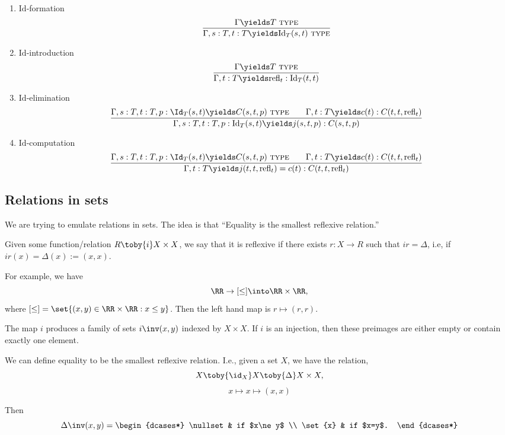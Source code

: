 \documentclass{article}
\newcommand\TYPE{\text{ \scshape{type}}}
\newcommand\IdT{\mathrm{Id}}
\newcommand\refl{\mathrm{refl}}
\begin{document}
\begin{enumerate}
    \item $\IdT$-formation
        \[ \frac{\Gamma \yields T\TYPE}{\Gamma,s:T,t:T
        \yields \IdT_T(s,t)\TYPE }
        \]
    \item $\IdT$-introduction
        \[ \frac{\Gamma \yields T\TYPE}{
            \Gamma,t:T\yields \refl_t:\IdT_T(t,t)
        }
        \]
    \item $\IdT$-elimination
        \[ \frac{
            \Gamma,s:T,t:T,p:\Id_T(s,t)
            \yields C(s,t,p)\TYPE 
            \qquad
            \Gamma,t:T\yields c(t) : C(t,t,\refl_t)
        }{
            \Gamma,s:T,t:T,p:\IdT_T(s,t) \yields 
            j(s,t,p) : C(s,t,p)
        }\]
    \item $\IdT$-computation
        \[ \frac{
            \Gamma,s:T,t:T,p:\Id_T(s,t)
            \yields C(s,t,p)\TYPE 
            \qquad
            \Gamma,t:T\yields c(t) : C(t,t,\refl_t)
        }{
            \Gamma,t:T\yields 
            j(t,t,\refl_t)=c(t) : C(t,t,\refl_t)
        }\]
\end{enumerate}

\subsection{Relations in sets}
We are trying to emulate 
relations in sets. The idea is that 
``Equality is the smallest reflexive relation.''

Given some function/relation $R\toby{i} X\times X$, 
we say that it is reflexive if there exists 
$r:X\to R$ such that $ir = \Delta$, i.e, if 
$ir(x)=\Delta(x):=(x,x)$.

For example, we have
\[ \RR\to [\le] \into \RR\times \RR,\]
where $[\le] = \set{(x,y)\in\RR\times \RR : x\le y}$. Then 
the left hand map is $r\mapsto (r,r)$.

The map $i$ produces a family of sets $i\inv(x,y)$ indexed by 
$X\times X$. If $i$ is an injection, then these preimages are 
either empty or contain exactly one element.

We can define equality to be the smallest reflexive relation.
I.e., given a set $X$, we have the relation,
\[ X\toby{\id_X} X\toby{\Delta} X\times X, \]
\[ x\mapsto x \mapsto (x,x) \]

Then 
\[ \Delta\inv(x,y) = \begin{dcases*}
    \nullset & if $x\ne y$ \\
    \set{x} & if $x=y$.
\end{dcases*}
    \]
\end{document}
